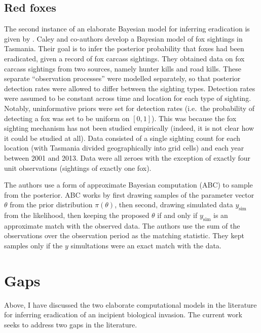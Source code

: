 \documentclass[
  oneside]{book}
\begin{document}
\hypertarget{red-foxes}{%
\subsection{Red foxes}\label{red-foxes}}

The second instance of an elaborate Bayesian model for inferring eradication is given by \citet{caley2015}. Caley and co-authors develop a Bayesian model of fox sightings in Tasmania. Their goal is to infer the posterior probability that foxes had been eradicated, given a record of fox carcass sightings. They obtained data on fox carcass sightings from two sources, namely hunter kills and road kills. These separate ``observation processes'' were modelled separately, so that posterior detection rates were allowed to differ between the sighting types. Detection rates were assumed to be constant across time and location for each type of sighting. Notably, uninformative priors were set for detection rates (i.e.~the probability of detecting a fox was set to be uniform on \([0, 1]\)). This was because the fox sighting mechanism has not been studied empirically (indeed, it is not clear how it could be studied at all). Data consisted of a single sighting count for each location (with Tasmania divided geographically into grid cells) and each year between 2001 and 2013. Data were all zeroes with the exception of exactly four unit observations (sightings of exactly one fox).

The authors use a form of approximate Bayesian computation (ABC) to sample from the posterior. ABC works by first drawing samples of the parameter vector \(\theta\) from the prior distribution \(\pi(\theta)\), then second, drawing simulated data \(y_{\text{sim}}\) from the likelihood, then keeping the proposed \(\theta\) if and only if \(y_{\text{sim}}\) is an approximate match with the observed data. The authors use the sum of the observations over the observation period as the matching statistic. They kept samples only if the \(y\) simultations were an exact match with the data.

\hypertarget{gaps}{%
\section{Gaps}\label{gaps}}

Above, I have discussed the two elaborate computational models in the literature for inferring eradication of an incipient biological invasion. The current work seeks to address two gaps in the literature.
\end{document}
